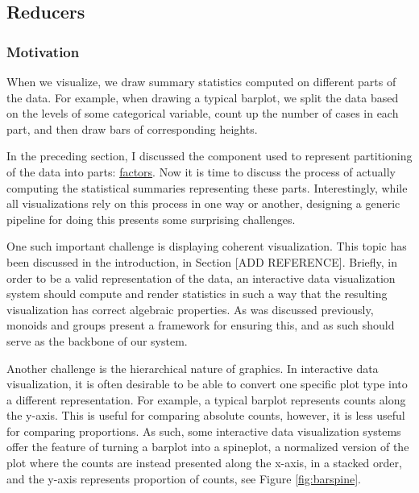 \documentclass[
]{book}
\theoremstyle{definition}
\theoremstyle{definition}
\theoremstyle{definition}
\theoremstyle{definition}
\theoremstyle{remark}
\begin{document}
\subsection{Reducers}\label{reducers}

\subsubsection{Motivation}\label{motivation}

When we visualize, we draw summary statistics computed on different parts of the data. For example, when drawing a typical barplot, we split the data based on the levels of some categorical variable, count up the number of cases in each part, and then draw bars of corresponding heights.

In the preceding section, I discussed the component used to represent partitioning of the data into parts: \hyperref[Factors]{factors}. Now it is time to discuss the process of actually computing the statistical summaries representing these parts. Interestingly, while all visualizations rely on this process in one way or another, designing a generic pipeline for doing this presents some surprising challenges.

One such important challenge is displaying coherent visualization. This topic has been discussed in the introduction, in Section {[}ADD REFERENCE{]}. Briefly, in order to be a valid representation of the data, an interactive data visualization system should compute and render statistics in such a way that the resulting visualization has correct algebraic properties. As was discussed previously, monoids and groups present a framework for ensuring this, and as such should serve as the backbone of our system.

Another challenge is the hierarchical nature of graphics. In interactive data visualization, it is often desirable to be able to convert one specific plot type into a different representation. For example, a typical barplot represents counts along the y-axis. This is useful for comparing absolute counts, however, it is less useful for comparing proportions. As such, some interactive data visualization systems offer the feature of turning a barplot into a spineplot, a normalized version of the plot where the counts are instead presented along the x-axis, in a stacked order, and the y-axis represents proportion of counts, see Figure \ref{fig:barspine}.
\end{document}
